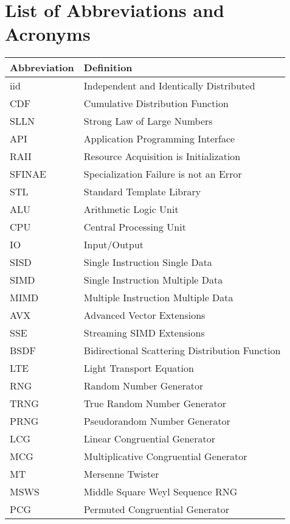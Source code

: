 \documentclass{stdlocal}
\begin{document}
  \section*{List of Abbreviations and Acronyms}

  \begin{table}[H]
    \center
    \renewcommand{\arraystretch}{1.3}
    \begin{tabularx}{\textwidth}{lX}
      \hline
      \textbf{Abbreviation} & \textbf{Definition} \\
      \hline
      \hline
      iid & Independent and Identically Distributed \\
      CDF & Cumulative Distribution Function \\
      SLLN & Strong Law of Large Numbers \\
      \hline
      API & Application Programming Interface \\
      RAII & Resource Acquisition is Initialization \\
      SFINAE & Specialization Failure is not an Error \\
      STL & Standard Template Library \\
      \hline
      ALU & Arithmetic Logic Unit \\
      CPU & Central Processing Unit \\
      IO & Input/Output \\
      SISD & Single Instruction Single Data \\
      SIMD & Single Instruction Multiple Data \\
      MIMD & Multiple Instruction Multiple Data \\
      AVX & Advanced Vector Extensions \\
      SSE & Streaming SIMD Extensions \\
      \hline
      BSDF & Bidirectional Scattering Distribution Function \\
      LTE & Light Transport Equation \\
      \hline
      RNG & Random Number Generator \\
      TRNG & True Random Number Generator \\
      PRNG & Pseudorandom Number Generator \\
      LCG & Linear Congruential Generator \\
      MCG & Multiplicative Congruential Generator \\
      MT & Mersenne Twister \\
      MSWS & Middle Square Weyl Sequence RNG \\
      PCG & Permuted Congruential Generator \\
      \hline
    \end{tabularx}
  \end{table}
\end{document}
